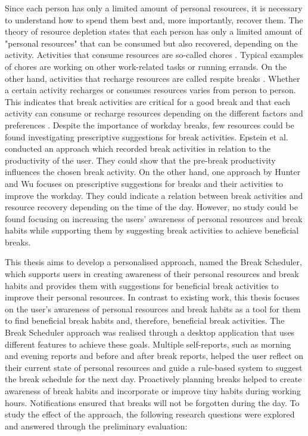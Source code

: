 \documentclass{hasel_thesis}
\begin{document}
Since each person has only a limited amount of personal resources, it is necessary to understand how to spend them best and, more importantly, recover them. The theory of resource depletion \cite{BaumeisterR.F.BratslavskyE.MuravenM.&TiceD.M..1998} states that each person has only a limited amount of "personal resources" that can be consumed but also recovered, depending on the activity. Activities that consume resources are so-called chores \cite{Trougakos.2009}. Typical examples of chores are working on other work-related tasks or running errands. On the other hand, activities that recharge resources are called respite breaks \cite{Trougakos.2009}. Whether a certain activity recharges or consumes resources varies from person to person. This indicates that break activities are critical for a good break and that each activity can consume or recharge resources depending on the different factors and preferences \cite{BaumeisterR.F.BratslavskyE.MuravenM.&TiceD.M..1998}. Despite the importance of workday breaks, few resources could be found investigating prescriptive suggestions for break activities. Epstein et al. \cite{epstein.2016t} conducted an approach which recorded break activities in relation to the productivity of the user. They could show that the pre-break productivity influences the chosen break activity. On the other hand, one approach by Hunter and Wu \cite{hunter2016give} focuses on prescriptive suggestions for breaks and their activities to improve the workday. They could indicate a relation between break activities and resource recovery depending on the time of the day. However, no study could be found focusing on increasing the users' awareness of personal resources and break habits while supporting them by suggesting break activities to achieve beneficial breaks.

This thesis aims to develop a personalised approach, named the Break Scheduler, which supports users in creating awareness of their personal resources and break habits and provides them with suggestions for beneficial break activities to improve their personal resources. In contrast to existing work, this thesis focuses on the user's awareness of personal resources and break habits as a tool for them to find beneficial break habits and, therefore, beneficial break activities. The Break Scheduler approach was realised through a desktop application that uses different features to achieve these goals. Multiple self-reports, such as morning and evening reports and before and after break reports, helped the user reflect on their current state of personal resources and guide a rule-based system to suggest the break schedule for the next day. Proactively planning breaks helped to create awareness of break habits and incorporate or improve tiny habits during working hours. Notifications ensured that breaks will not be forgotten during the day. To study the effect of the approach, the following research questions were explored and answered through the preliminary evaluation:
\end{document}
